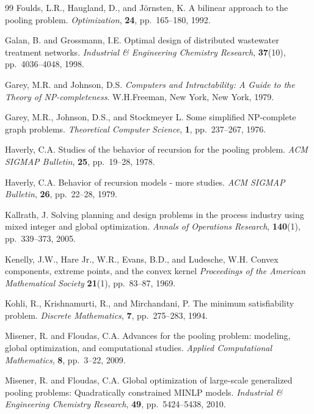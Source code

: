 \documentclass[smallcondensed]{svjour3}
\begin{document}
\begin{thebibliography}{99}
Foulds, L.R., Haugland, D., and J\"{o}rnsten, K.
\newblock A bilinear approach to the pooling problem.
\newblock \emph{Optimization},
\newblock \textbf{24}, pp.\ 165--180, 1992.

Galan, B. and Grossmann, I.E.
\newblock Optimal design of distributed wastewater treatment networks.
\newblock \emph{Industrial \& Engineering Chemistry Research}, 
\newblock \textbf{37}(10), pp.\ 4036--4048, 1998.

Garey, M.R. and Johnson, D.S.
\newblock \emph{Computers and Intractability: A Guide to the Theory of NP-completeness}.
\newblock W.H.Freeman, New York, New York, 1979.

Garey, M.R., Johnson, D.S., and Stockmeyer L.
\newblock Some simplified NP-complete graph problems.
\newblock \emph{Theoretical Computer Science},
\newblock \textbf{1}, pp.\ 237--267, 1976.

Haverly, C.A.
\newblock Studies of the behavior of recursion for the pooling problem.
\newblock \emph{ACM SIGMAP Bulletin},
\newblock \textbf{25}, pp.\ 19--28, 1978.

Haverly, C.A.
\newblock Behavior of recursion models - more studies.
\newblock \emph{ACM SIGMAP Bulletin},
\newblock \textbf{26}, pp.\ 22--28, 1979.

Kallrath, J.
\newblock Solving planning and design problems in the process industry using mixed integer and global optimization.
\newblock \emph{Annals of Operations Research},
\newblock \textbf{140}(1), pp.\ 339--373, 2005.

Kenelly, J.W., Hare Jr., W.R., Evans, B.D., and Ludesche, W.H.
\newblock Convex components, extreme points, and the convex kernel
\newblock \emph{Proceedings of the American Mathematical Society}
\newblock \textbf{21}(1), pp.\ 83--87, 1969.

Kohli, R., Krishnamurti, R., and Mirchandani, P.
\newblock The minimum satisfiability problem.
\newblock \emph{Discrete Mathematics},
\newblock \textbf{7}, pp.\ 275--283, 1994.

Misener, R. and Floudas, C.A.
\newblock Advances for the pooling problem: modeling, global optimization, and computational studies.
\newblock \emph{Applied Computational Mathematics},
\newblock \textbf{8}, pp.\ 3--22, 2009.

Misener, R. and Floudas, C.A.
\newblock Global optimization of large-scale generalized pooling problems: Quadratically constrained MINLP models.
\newblock \emph{Industrial \& Engineering Chemistry Research}, 
\newblock \textbf{49}, pp.\ 5424--5438, 2010.


\end{thebibliography}
\end{document}
